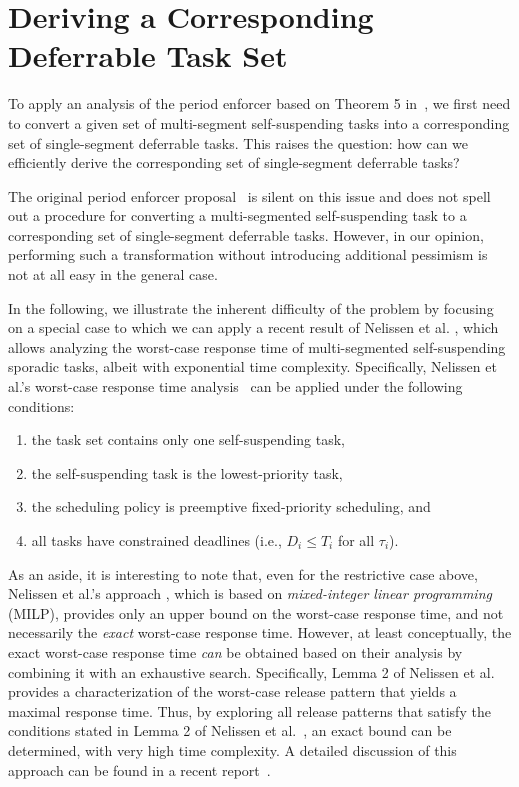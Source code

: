 
\section{Deriving a Corresponding Deferrable Task Set}
\label{sec:convert}

To apply an analysis of the period enforcer based on Theorem 5 in~\cite{Raj:suspension1991}, we first need to convert a given set of multi-segment self-suspending tasks into a corresponding set of single-segment deferrable tasks. This raises the question: how can we efficiently derive the corresponding set of single-segment deferrable tasks? 

The original period enforcer proposal~\cite{Raj:suspension1991} is silent on this issue and does not spell out a procedure for converting a multi-segmented self-suspending task to a corresponding set of single-segment deferrable tasks. However, in our opinion, performing such a transformation without introducing additional pessimism is not at all easy in the general case.

In the following, we illustrate the inherent difficulty of the problem by focusing on a special case to which we can apply a recent result of Nelissen et al. \cite{ecrts15nelissen}, which allows analyzing the worst-case response time of multi-segmented self-suspending sporadic tasks, albeit with exponential time complexity. Specifically,  
Nelissen et al.'s worst-case response time analysis~\cite{ecrts15nelissen} can be applied under the following conditions:
\begin{enumerate}
	\item the task set contains only one self-suspending task, 
	\item the self-suspending task is the lowest-priority task, 
	\item the scheduling policy is preemptive fixed-priority scheduling, and 
	\item all tasks have constrained deadlines (i.e., $D_i \leq T_i$ for all $\tau_i$).
\end{enumerate}

As an aside, it is interesting to note that, even for the restrictive case above,  Nelissen et al.'s approach \cite{ecrts15nelissen}, which is based on \emph{mixed-integer linear programming} (MILP), provides only an upper bound on the worst-case response time, and not necessarily the \emph{exact} worst-case response time. However, at least conceptually, the exact worst-case response time \emph{can} be obtained based on their analysis by combining it with an exhaustive search. Specifically, Lemma 2 of Nelissen et al.~\cite{ecrts15nelissen} provides a characterization of the worst-case release pattern that yields a maximal response time. Thus, by exploring all  release patterns that satisfy the conditions stated in Lemma 2 of Nelissen et al.~\cite{ecrts15nelissen}, an exact bound can be determined, with very high time complexity. A detailed discussion of this approach can be found in a recent report~\cite{Chen2016b}. 

